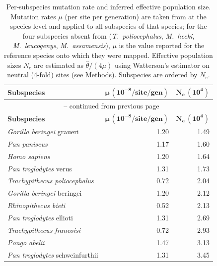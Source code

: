 \begin{center}
    \footnotesize
    \renewcommand{\arraystretch}{1.1}

    \begin{longtable}{l r r}
        \toprule
        \textbf{Subspecies} & $\boldsymbol{\mu\,(10^{-8}\text{/site/gen})}$ & $\boldsymbol{N_e\,(10^{4})}$ \\
        \midrule
        \endfirsthead
        \multicolumn{3}{c}{\tablename\ \thetable{} -- continued from previous page} \\
        \toprule
        \textbf{Subspecies} & $\boldsymbol{\mu\,(10^{-8}\text{/site/gen})}$ & $\boldsymbol{N_e\,(10^{4})}$ \\
        \midrule
        \endhead
        \bottomrule
        \addlinespace[2ex]
        \rowcolor{white}\caption{Per-subspecies mutation rate and inferred effective population size. Mutation rates $\mu$ (per site per generation) are taken from \citet{kuderna2023} at the species level and applied to all subspecies of that species; for the four subspecies absent from \citet{kuderna2023} (\textit{T.\ poliocephalus}, \textit{M.\ hecki}, \textit{M.\ leucogenys}, \textit{M.\ assamensis}), $\mu$ is the value reported for the reference species onto which they were mapped. Effective population sizes $N_e$ are estimated as $\hat\theta / (4\mu)$ using Watterson's estimator on neutral (4-fold) sites (see Methods). Subspecies are ordered by $N_e$.}\label{tab:species_summary}
        \endlastfoot
        \textit{Gorilla beringei} graueri & 1.20 & 1.49 \\
        \textit{Pan paniscus} & 1.17 & 1.60 \\
        \textit{Homo sapiens} & 1.20 & 1.64 \\
        \textit{Pan troglodytes} verus & 1.31 & 1.73 \\
        \textit{Trachypithecus poliocephalus} & 0.72 & 2.04 \\
        \textit{Gorilla beringei} beringei & 1.20 & 2.12 \\
        \textit{Rhinopithecus bieti} & 0.52 & 2.13 \\
        \textit{Pan troglodytes} ellioti & 1.31 & 2.69 \\
        \textit{Trachypithecus francoisi} & 0.72 & 2.93 \\
        \textit{Pongo abelii} & 1.47 & 3.13 \\
        \textit{Pan troglodytes} schweinfurthii & 1.31 & 3.45 \\

\end{longtable}
\end{center}
